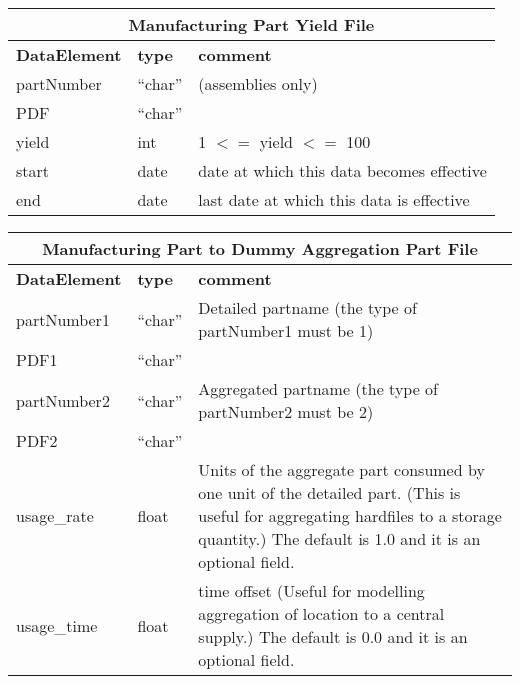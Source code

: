 \vspace{.5in}
 

\begin{tabular}{llp{4in}}
\multicolumn{3}{c}{{\bf Manufacturing Part Yield File}}\\ \hline\hline
{\bf DataElement} &  {\bf type}  &   {\bf comment} \\ \hline
partNumber & ``char'' &  (assemblies only) \\
PDF   & ``char''  \\
yield     &      int  &    1 $<=$ yield $<=$ 100 \\
start     &      date &    date at which this data becomes effective  \\
end       &      date &    last date at which this data is effective
\end{tabular}

\vspace{.5in}

\begin{tabular}{llp{4in}}
\multicolumn{3}{c}{{\bf Manufacturing Part to Dummy Aggregation Part File}}\\ \hline\hline
{\bf DataElement} &  {\bf type}  &   {\bf comment} \\ \hline
partNumber1 & ``char'' &   Detailed partname (the type of partNumber1 must be 1) \\
PDF1   & ``char''  \\
partNumber2  & ``char'' &   Aggregated partname (the type of partNumber2 must be 2) \\
PDF2   & ``char''  \\
usage\_rate & float & Units of the aggregate part consumed by one unit of
               the detailed part.  (This is useful for aggregating hardfiles
               to a storage quantity.)  The default is 1.0 and it is an
               optional field. \\
usage\_time & float & time offset (Useful for modelling aggregation of location
                  to a central supply.)  The default is 0.0 and it is an
                  optional field. \\
\end{tabular}

\vspace{.5in}

